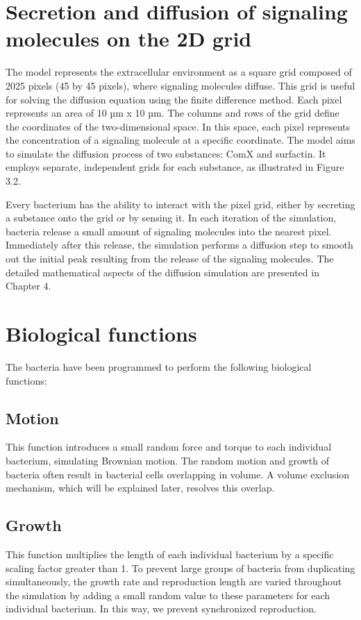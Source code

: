 \section{Secretion and diffusion of signaling molecules on the 2D grid}\label{sec:contrib1:theme1}

The model represents the extracellular environment as a square grid composed of 2025 pixels (45 by 45 pixels), where signaling molecules diffuse. This grid is useful for solving the diffusion equation using the finite difference method. Each pixel represents an area of 10 µm x 10 µm. The columns and rows of the grid define the coordinates of the two-dimensional space. In this space, each pixel represents the concentration of a signaling molecule at a specific coordinate. The model aims to simulate the diffusion process of two substances: ComX and surfactin. It employs separate, independent grids for each substance, as illustrated in Figure 3.2.

Every bacterium has the ability to interact with the pixel grid, either by secreting a substance onto the grid or by sensing it. In each iteration of the simulation, bacteria release a small amount of signaling molecules into the nearest pixel. Immediately after this release, the simulation performs a diffusion step to smooth out the initial peak resulting from the release of the signaling molecules. The detailed mathematical aspects of the diffusion simulation are presented in Chapter 4.




\section{Biological functions}\label{sec:contrib1:theme1:A}

The bacteria have been programmed to perform the following biological functions:

\subsection{Motion} This function introduces a small random force and torque to each individual bacterium, simulating Brownian motion. The random motion and growth of bacteria often result in bacterial cells overlapping in volume. A volume exclusion mechanism, which will be explained later, resolves this overlap.

\subsection{Growth} This function multiplies the length of each individual bacterium by a specific scaling factor greater than 1. To prevent large groups of bacteria from duplicating simultaneously, the growth rate and reproduction length are varied throughout the simulation by adding a small random value to these parameters for each individual bacterium. In this way, we prevent synchronized reproduction.


